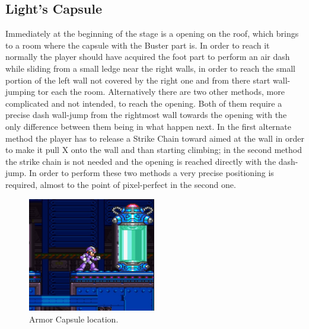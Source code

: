 \subsection{Light's Capsule}\label{X2:Arm_parts}
Immediately at the beginning of the stage is a opening on the roof, which brings to a room where the capsule with the Buster part is. In order to reach it normally the player should have acquired the foot part to perform an air dash while sliding from a small ledge near the right walls, in order to reach the small portion of the left wall not covered by the right one and from there start wall-jumping tor each the room. Alternatively there are two other methods, more complicated and not intended, to reach the opening. Both of them require a precise dash wall-jump from the rightmost wall towards the opening with the only difference between them being in what happen next. In the first alternate method the player has to release a Strike Chain toward aimed at the wall in order to make it pull X onto the wall and than starting climbing; in the second method the strike chain is not needed and the opening is reached directly with the dash-jump. In order to perform these two methods a very precise positioning is required, almost to the point of pixel-perfect in the second one.
\begin{figure}[htp]
	\centering
	\includegraphics[height=5cm]{figures/X2/Wheel_gator/Gator_capsule.jpg}
	\caption{Armor Capsule location.}
\end{figure}


